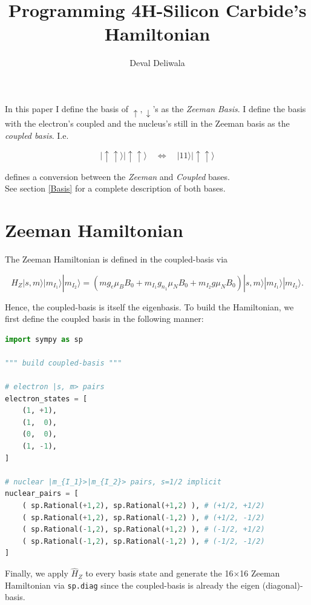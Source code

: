 \documentclass[svgnames]{article}
\title{Programming 4H-Silicon Carbide's Hamiltonian}
\author{Deval Deliwala}
\begin{document}
\maketitle
\tableofcontents 

\vfill
In this paper I define the basis of $\uparrow, \downarrow$'s as the
\textit{Zeeman Basis}. I define the basis with the electron's coupled and the
nucleus's still in the Zeeman basis as the \textit{coupled basis}. I.e. 

\[
|\uparrow \uparrow\rangle|\uparrow \uparrow\rangle \quad \Longleftrightarrow \quad
|11\rangle| \uparrow \uparrow\rangle 
\] \vspace{3px}

defines a conversion between the \textit{Zeeman} and \textit{Coupled} bases.\\ 

See section \ref{Basis} for a complete description of both bases.  
\vfill


\newpage
\section{Zeeman Hamiltonian}

The Zeeman Hamiltonian is defined in the coupled-basis via 

\[
    \hat{H}_Z |s,m\rangle|m_{I_1}\rangle |m_{I_2}\rangle = (mg_e\mu_BB_0 +
    m_{I_1}g_{n_1}\mu_NB_0 + m_{I_2}g\mu_NB_0 )|s, m\rangle |m_{I_1}\rangle
    |m_{I_2}\rangle. 
\] \vspace{3px}

Hence, the coupled-basis is itself the eigenbasis. To build the Hamiltonian, we
first define the coupled basis in the following manner:

\begin{lstlisting}[language=Python]
import sympy as sp

""" build coupled-basis """ 

# electron |s, m> pairs 
electron_states = [
    (1, +1),
    (1,  0),
    (0,  0),
    (1, -1),
]

# nuclear |m_{I_1}>|m_{I_2}> pairs, s=1/2 implicit 
nuclear_pairs = [
    ( sp.Rational(+1,2), sp.Rational(+1,2) ), # (+1/2, +1/2) 
    ( sp.Rational(+1,2), sp.Rational(-1,2) ), # (+1/2, -1/2) 
    ( sp.Rational(-1,2), sp.Rational(+1,2) ), # (-1/2, +1/2) 
    ( sp.Rational(-1,2), sp.Rational(-1,2) ), # (-1/2, -1/2)
]
\end{lstlisting}

Finally, we apply $\hat{H}_Z$ to every basis state and generate the 16$\times$16 
Zeeman Hamiltonian via \verb|sp.diag| since the coupled-basis is already the
eigen (diagonal)-basis. 
\end{document}
